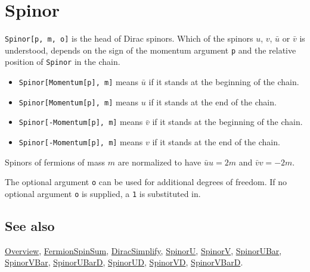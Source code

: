 \documentclass[../FeynCalcManual.tex]{subfiles}
\begin{document}
\begin{Shaded}
\begin{Highlighting}[]
 
\end{Highlighting}
\end{Shaded}

\hypertarget{spinor}{
\section{Spinor}\label{spinor}}

\texttt{Spinor[\allowbreak{}p,\ \allowbreak{}m,\ \allowbreak{}o]} is the
head of Dirac spinors. Which of the spinors \(u\), \(v\), \(\bar{u}\) or
\(\bar{v}\) is understood, depends on the sign of the momentum argument
\texttt{p} and the relative position of \texttt{Spinor} in the chain.

\begin{itemize}
\item
  \texttt{Spinor[\allowbreak{}Momentum[\allowbreak{}p],\ \allowbreak{}m]}
  means \(\bar{u}\) if it stands at the beginning of the chain.
\item
  \texttt{Spinor[\allowbreak{}Momentum[\allowbreak{}p],\ \allowbreak{}m]}
  means \(u\) if it stands at the end of the chain.
\item
  \texttt{Spinor[\allowbreak{}-Momentum[\allowbreak{}p],\ \allowbreak{}m]}
  means \(\bar{v}\) if it stands at the beginning of the chain.
\item
  \texttt{Spinor[\allowbreak{}-Momentum[\allowbreak{}p],\ \allowbreak{}m]}
  means \(v\) if it stands at the end of the chain.
\end{itemize}

Spinors of fermions of mass \(m\) are normalized to have
\(\bar{u} u=2 m\) and \(\bar{v} v=-2 m\).

The optional argument \texttt{o} can be used for additional degrees of
freedom. If no optional argument \texttt{o} is supplied, a \texttt{1} is
substituted in.

\subsection{See also}

\hyperlink{toc}{Overview}, \hyperlink{fermionspinsum}{FermionSpinSum},
\hyperlink{diracsimplify}{DiracSimplify}, \hyperlink{spinoru}{SpinorU},
\hyperlink{spinorv}{SpinorV}, \hyperlink{spinorubar}{SpinorUBar},
\hyperlink{spinorvbar}{SpinorVBar},
\hyperlink{spinorubard}{SpinorUBarD}, \hyperlink{spinorud}{SpinorUD},
\hyperlink{spinorvd}{SpinorVD}, \hyperlink{spinorvbard}{SpinorVBarD}.
\end{document}
